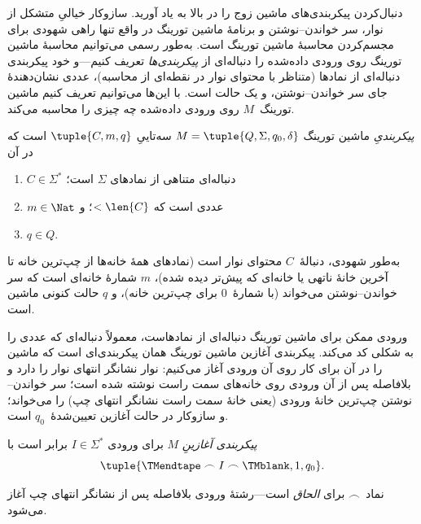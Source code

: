 \documentclass[../../../include/open-logic-section]{subfiles}
\begin{document}

\begin{explain}
دنبال‌کردن پیکربندی‌های ماشین زوج را در بالا به یاد آورید. سازوکار
خیالیِ متشکل از نوار، سر خواندن--نوشتن و برنامهٔ ماشین تورینگ در واقع
تنها راهی شهودی برای مجسم‌کردن محاسبهٔ ماشین تورینگ است. به‌طور رسمی
می‌توانیم محاسبهٔ ماشین تورینگ روی ورودی داده‌شده را دنباله‌ای از
\emph{پیکربندی‌ها} تعریف کنیم---و خود پیکربندی دنباله‌ای از نمادها
(متناظر با محتوای نوار در نقطه‌ای از محاسبه)، عددی نشان‌دهندهٔ جای سر
خواندن--نوشتن، و یک حالت است. با این‌ها می‌توانیم تعریف کنیم ماشین
تورینگ~$M$ روی ورودی داده‌شده چه چیزی را محاسبه می‌کند.
\end{explain}

\begin{defn}[پیکربندی]
\emph{پیکربندیِ} ماشین تورینگ
$M=\tuple{Q,\Sigma,q_0,\delta}$ سه‌تاییِ $\tuple{C,m,q}$ است که در آن
\begin{enumerate}
\item $C\in\Sigma^*$ دنباله‌ای متناهی از نمادهای $\Sigma$ است؛
\item $m\in\Nat$ عددی است که $<\len{C}$؛ و
\item $q\in Q$.
\end{enumerate}
به‌طور شهودی، دنبالهٔ~$C$ محتوای نوار است (نمادهای همهٔ خانه‌ها از
چپ‌ترین خانه تا آخرین خانهٔ ناتهی یا خانه‌ای که پیش‌تر دیده شده)،
$m$ شمارهٔ خانه‌ای است که سر خواندن--نوشتن می‌خواند (با شمارهٔ~$0$
برای چپ‌ترین خانه)، و $q$ حالت کنونی ماشین است.
\end{defn}

\begin{explain}
ورودی ممکن برای ماشین تورینگ دنباله‌ای از نمادهاست، معمولاً دنباله‌ای
که عددی را به شکلی کد می‌کند. پیکربندی آغازین ماشین تورینگ همان
پیکربندی‌ای است که ماشین را در آن برای کار روی آن ورودی آغاز می‌کنیم:
نوار نشانگر انتهای نوار را دارد و بلافاصله پس از آن ورودی روی خانه‌های
سمت راست نوشته شده است؛ سر خواندن--نوشتن چپ‌ترین خانهٔ ورودی (یعنی
خانهٔ سمت راست نشانگر انتهای چپ) را می‌خواند؛ و سازوکار در حالت آغازین
تعیین‌شدهٔ~$q_0$ است.
\end{explain}

\begin{defn}
\emph{پیکربندی آغازینِ} $M$ برای ورودی $I\in\Sigma^*$ برابر است با
\[
\tuple{\TMendtape \frown I \frown \TMblank, 1, q_0}.
\]
\end{defn}

\begin{explain}
نماد~$\frown$ برای \emph{الحاق} است---رشتهٔ ورودی بلافاصله پس از
نشانگر انتهای چپ آغاز می‌شود.
\end{explain}
\end{document}
